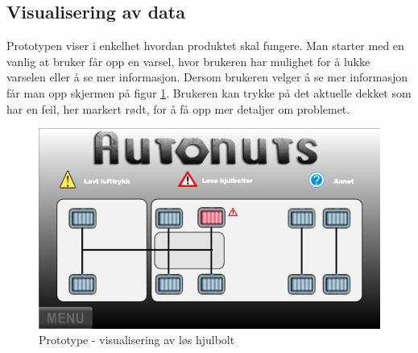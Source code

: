 \subsection{Visualisering av data}
Prototypen viser i enkelhet hvordan produktet skal fungere. Man starter med en vanlig at bruker får opp en varsel, hvor brukeren har mulighet for å lukke varselen eller å se mer informasjon. Dersom brukeren velger å se mer informasjon får man opp skjermen på figur \ref{fig:proto}. Brukeren kan trykke på det aktuelle dekket som har en feil, her markert rødt, for å få opp mer detaljer om problemet.
\begin{figure}[H]
		\centering
		\includegraphics[width=1.00\textwidth]{images/prototype.png}
		\caption{Prototype - visualisering av løs hjulbolt}
		\label{fig:proto}
	\end{figure}
